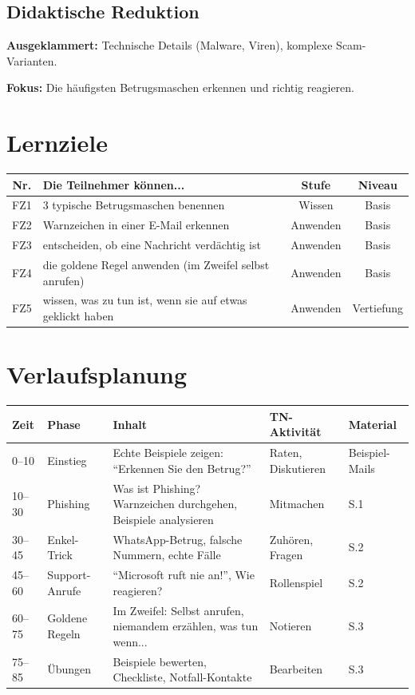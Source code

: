 \documentclass[11pt,a4paper]{article}
\begin{document}
\subsection{Didaktische Reduktion}
\textbf{Ausgeklammert:} Technische Details (Malware, Viren), komplexe Scam-Varianten.

\textbf{Fokus:} Die häufigsten Betrugsmaschen erkennen und richtig reagieren.

\section{Lernziele}

\begin{tabular}{|c|p{7cm}|c|c|}
\hline
\textbf{Nr.} & \textbf{Die Teilnehmer können...} & \textbf{Stufe} & \textbf{Niveau} \\
\hline
FZ1 & 3 typische Betrugsmaschen benennen & Wissen & Basis \\
FZ2 & Warnzeichen in einer E-Mail erkennen & Anwenden & Basis \\
FZ3 & entscheiden, ob eine Nachricht verdächtig ist & Anwenden & Basis \\
FZ4 & die goldene Regel anwenden (im Zweifel selbst anrufen) & Anwenden & Basis \\
FZ5 & wissen, was zu tun ist, wenn sie auf etwas geklickt haben & Anwenden & Vertiefung \\
\hline
\end{tabular}

\section{Verlaufsplanung}

\begin{longtable}{|p{1cm}|p{2cm}|p{5cm}|p{3cm}|p{2cm}|}
\hline
\textbf{Zeit} & \textbf{Phase} & \textbf{Inhalt} & \textbf{TN-Aktivität} & \textbf{Material} \\
\hline
0--10 & Einstieg & Echte Beispiele zeigen: ``Erkennen Sie den Betrug?'' & Raten, Diskutieren & Beispiel-Mails \\
\hline
10--30 & Phishing & Was ist Phishing? Warnzeichen durchgehen, Beispiele analysieren & Mitmachen & S.1 \\
\hline
30--45 & Enkel-Trick & WhatsApp-Betrug, falsche Nummern, echte Fälle & Zuhören, Fragen & S.2 \\
\hline
45--60 & Support-Anrufe & ``Microsoft ruft nie an!'', Wie reagieren? & Rollenspiel & S.2 \\
\hline
60--75 & Goldene Regeln & Im Zweifel: Selbst anrufen, niemandem erzählen, was tun wenn... & Notieren & S.3 \\
\hline
75--85 & Übungen & Beispiele bewerten, Checkliste, Notfall-Kontakte & Bearbeiten & S.3 \\
\hline
\end{longtable}
\end{document}
